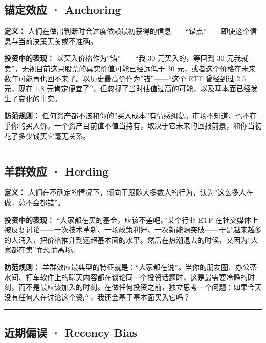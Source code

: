 \documentclass[a4paper,11pt,oneside,fontset=none,UTF8,zihao=-4]{ctexbook}
\begin{document}
\subsection{锚定效应 ·
Anchoring}\label{ux951aux5b9aux6548ux5e94-anchoring}

\textbf{定义：}
人们在做出判断时会过度依赖最初获得的信息------``锚点''------即使这个信息与当前决策无关或不准确。

\textbf{投资中的表现：} 以买入价格作为''锚''------``我 30
元买入的，等回到 30 元我就卖''，无视目前这只股票的真实价值可能已经远低于
30
元，或者这个价格在未来数年可能再也回不来了。以历史最高价作为''锚''------``这个
ETF 曾经到过 2.5 元，现在 1.8
元肯定便宜了''，但忽视了当时估值过高的可能，以及基本面已经发生了变化的事实。

\textbf{防范规则：}
任何资产都不该和你的''买入成本''有情感纠葛。市场不知道、也不在乎你的买入价。一个资产目前值不值当持有，取决于它未来的回报前景，和你当初花了多少钱买它毫无关系。

\begin{center}{\color{dh-bronze}\rule{0.2\textwidth}{0.5pt}}\end{center}

\subsection{羊群效应 · Herding}\label{ux7f8aux7fa4ux6548ux5e94-herding}

\textbf{定义：}
人们在不确定的情况下，倾向于跟随大多数人的行为，认为''这么多人在做，总不会都错''。

\textbf{投资中的表现：} ``大家都在买的基金，应该不差吧。''某个行业 ETF
在社交媒体上被反复讨论------一次技术革新、一场政策利好、一次新能源突破------于是越来越多的人涌入，把价格推升到远超基本面的水平。然后在热潮退去的时候，又因为''大家都在卖''而恐慌离场。

\textbf{防范规则：}
羊群效应最典型的特征就是：``大家都在说''。当你的朋友圈、办公茶水间、打车软件上的聊天内容都在谈论同一个投资话题时，这是最需要冷静的时刻，而不是最应该加入的时刻。在做任何投资之前，独立思考一个问题：如果今天没有任何人在讨论这个资产，我还会基于基本面买入它吗？

\begin{center}{\color{dh-bronze}\rule{0.2\textwidth}{0.5pt}}\end{center}

\subsection{近期偏误 · Recency
Bias}\label{ux8fd1ux671fux504fux8bef-recency-bias}
\end{document}
